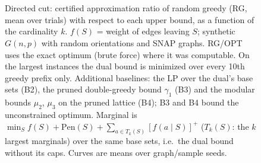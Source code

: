 \begin{figure}[t]
\centering
\setlength{\rgplotwidth}{0.49\columnwidth}
\\[1pt]
\hfill
\\
\hfill

\caption{Directed cut: certified approximation ratio of random greedy (RG, mean over trials) with respect to each upper bound, as a function of the cardinality $k$. $f(S)$ = weight of edges leaving $S$; synthetic $G(n,p)$ with random orientations and SNAP graphs. RG/OPT uses the exact optimum (brute force) where it was computable. On the largest instances the dual bound is minimized over every 10th greedy prefix only. Additional baselines: the LP over the dual's base sets (B2), the pruned double-greedy bound $\gamma_1$ (B3) and the modular bounds $\mu_2$, $\mu_3$ on the pruned lattice (B4); B3 and B4 bound the unconstrained optimum. Marginal is $\min_S f(S)+\mathrm{Pen}(S)+\sum_{a\in T_k(S)}[f(a\mid S)]^+$ ($T_k(S)$: the $k$ largest marginals) over the same base sets, i.e.\ the dual bound without its caps. Curves are means over graph/sample seeds.}
\label{fig:rg-directed_cut-baselines}
\end{figure}
